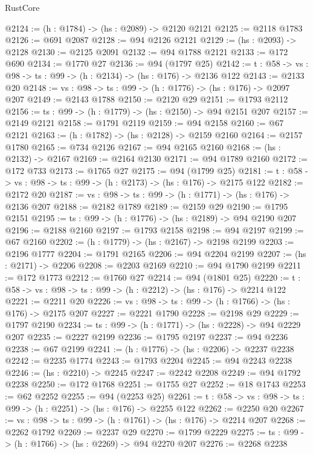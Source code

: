 \begin{lexlean}{RustCore}
\begin{coremodule}
@2124 := (h : @1784) -> (hs : @2089) -> @2120 @2121
@2125 := @2118 @1783
@2126 := @691 @2087
@2128 := @94 @2126 @2121
@2129 := (hs : @2093) -> @2128
@2130 := @2125 @2091
@2132 := @94 @1788 @2121
@2133 := @172 @690
@2134 := @1770 @27
@2136 := @94 (@1797 @25)
@2142 := {t : @58} -> {vs : @98} -> {ts : @99} -> (h : @2134) -> (hs : @176) -> @2136 @122
@2143 := @2133 @20
@2148 := {vs : @98} -> {ts : @99} -> (h : @1776) -> (hs : @176) -> @2097 @207
@2149 := @2143 @1788
@2150 := @2120 @29
@2151 := @1793 @2112
@2156 := {ts : @99} -> (h : @1779) -> (hs : @2150) -> @94 @2151 @207
@2157 := @2149 @2121
@2158 := @1791 @2119
@2159 := @94 @2158
@2160 := @67 @2121
@2163 := (h : @1782) -> (hs : @2128) -> @2159 @2160
@2164 := @2157 @1780
@2165 := @734 @2126
@2167 := @94 @2165 @2160
@2168 := (hs : @2132) -> @2167
@2169 := @2164 @2130
@2171 := @94 @1789 @2160
@2172 := @172 @733
@2173 := @1765 @27
@2175 := @94 (@1799 @25)
@2181 := {t : @58} -> {vs : @98} -> {ts : @99} -> (h : @2173) -> (hs : @176) -> @2175 @122
@2182 := @2172 @20
@2187 := {vs : @98} -> {ts : @99} -> (h : @1771) -> (hs : @176) -> @2136 @207
@2188 := @2182 @1789
@2189 := @2159 @29
@2190 := @1795 @2151
@2195 := {ts : @99} -> (h : @1776) -> (hs : @2189) -> @94 @2190 @207
@2196 := @2188 @2160
@2197 := @1793 @2158
@2198 := @94 @2197
@2199 := @67 @2160
@2202 := (h : @1779) -> (hs : @2167) -> @2198 @2199
@2203 := @2196 @1777
@2204 := @1791 @2165
@2206 := @94 @2204 @2199
@2207 := (hs : @2171) -> @2206
@2208 := @2203 @2169
@2210 := @94 @1790 @2199
@2211 := @172 @1773
@2212 := @1760 @27
@2214 := @94 (@1801 @25)
@2220 := {t : @58} -> {vs : @98} -> {ts : @99} -> (h : @2212) -> (hs : @176) -> @2214 @122
@2221 := @2211 @20
@2226 := {vs : @98} -> {ts : @99} -> (h : @1766) -> (hs : @176) -> @2175 @207
@2227 := @2221 @1790
@2228 := @2198 @29
@2229 := @1797 @2190
@2234 := {ts : @99} -> (h : @1771) -> (hs : @2228) -> @94 @2229 @207
@2235 := @2227 @2199
@2236 := @1795 @2197
@2237 := @94 @2236
@2238 := @67 @2199
@2241 := (h : @1776) -> (hs : @2206) -> @2237 @2238
@2242 := @2235 @1774
@2243 := @1793 @2204
@2245 := @94 @2243 @2238
@2246 := (hs : @2210) -> @2245
@2247 := @2242 @2208
@2249 := @94 @1792 @2238
@2250 := @172 @1768
@2251 := @1755 @27
@2252 := @18 @1743
@2253 := @62 @2252
@2255 := @94 (@2253 @25)
@2261 := {t : @58} -> {vs : @98} -> {ts : @99} -> (h : @2251) -> (hs : @176) -> @2255 @122
@2262 := @2250 @20
@2267 := {vs : @98} -> {ts : @99} -> (h : @1761) -> (hs : @176) -> @2214 @207
@2268 := @2262 @1792
@2269 := @2237 @29
@2270 := @1799 @2229
@2275 := {ts : @99} -> (h : @1766) -> (hs : @2269) -> @94 @2270 @207
@2276 := @2268 @2238

\end{coremodule}
\end{lexlean}
